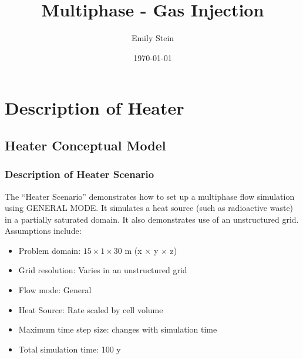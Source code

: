 \documentclass{beamer}
\begin{document}
\title{Multiphase - Gas Injection}
\author{Emily Stein}
\date{\today}


\section{Description of Heater}

\subsection{Heater Conceptual Model}

\begin{frame}\frametitle{Description of Heater Scenario}
The ``Heater Scenario'' demonstrates how to set up a multiphase flow simulation using GENERAL MODE. It simulates a heat source (such as radioactive waste) in a partially saturated domain. It also demonstrates use of an unstructured grid. Assumptions include:
\begin{itemize}
  \item Problem domain: $15 \times 1 \times 30$ m (x $\times$ y $\times$ z)
  \item Grid resolution: Varies in an unstructured grid
  \item Flow mode: General
  \item Heat Source: Rate scaled by cell volume
  \item Maximum time step size: changes with simulation time
  \item Total simulation time: 100 y
\end{itemize}

\end{frame}

\end{document}
